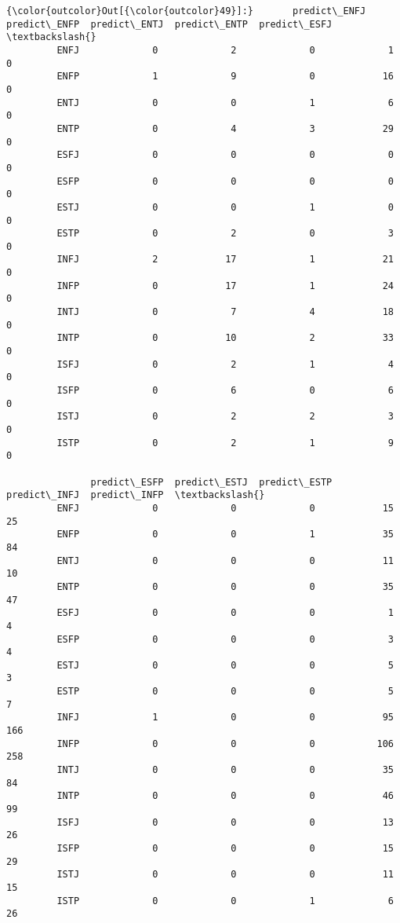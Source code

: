 \documentclass[11pt]{article}
\begin{document}
\begin{Verbatim}[commandchars=\\\{\}]
{\color{outcolor}Out[{\color{outcolor}49}]:}       predict\_ENFJ  predict\_ENFP  predict\_ENTJ  predict\_ENTP  predict\_ESFJ  \textbackslash{}
         ENFJ             0             2             0             1             0   
         ENFP             1             9             0            16             0   
         ENTJ             0             0             1             6             0   
         ENTP             0             4             3            29             0   
         ESFJ             0             0             0             0             0   
         ESFP             0             0             0             0             0   
         ESTJ             0             0             1             0             0   
         ESTP             0             2             0             3             0   
         INFJ             2            17             1            21             0   
         INFP             0            17             1            24             0   
         INTJ             0             7             4            18             0   
         INTP             0            10             2            33             0   
         ISFJ             0             2             1             4             0   
         ISFP             0             6             0             6             0   
         ISTJ             0             2             2             3             0   
         ISTP             0             2             1             9             0   
         
               predict\_ESFP  predict\_ESTJ  predict\_ESTP  predict\_INFJ  predict\_INFP  \textbackslash{}
         ENFJ             0             0             0            15            25   
         ENFP             0             0             1            35            84   
         ENTJ             0             0             0            11            10   
         ENTP             0             0             0            35            47   
         ESFJ             0             0             0             1             4   
         ESFP             0             0             0             3             4   
         ESTJ             0             0             0             5             3   
         ESTP             0             0             0             5             7   
         INFJ             1             0             0            95           166   
         INFP             0             0             0           106           258   
         INTJ             0             0             0            35            84   
         INTP             0             0             0            46            99   
         ISFJ             0             0             0            13            26   
         ISFP             0             0             0            15            29   
         ISTJ             0             0             0            11            15   
         ISTP             0             0             1             6            26   
         

\end{Verbatim}
\end{document}
